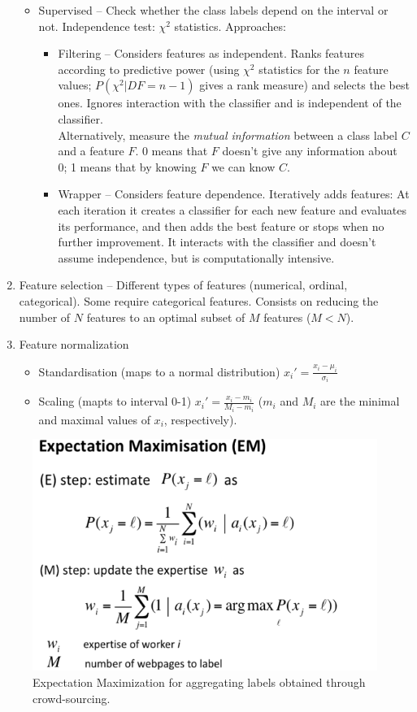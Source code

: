 \begin{enumerate}
\begin{itemize}
			\item Supervised -- Check whether the class labels depend on the interval or not. Independence test: $\chi^2$ statistics. Approaches:
			\begin{itemize}
				\item Filtering -- Considers features as independent. Ranks features according to predictive power (using $\chi^2$ statistics for the $n$ feature values; $P(\chi^2 | DF=n-1)$ gives a rank measure) and selects the best ones. Ignores interaction with the classifier and is independent of the classifier.\\
				Alternatively, measure the \emph{mutual information} between a class label $C$ and a feature $F$. 0 means that $F$ doesn't give any information about 0; 1 means that by knowing $F$ we can know $C$.
				\item Wrapper -- Considers feature dependence. Iteratively adds features: At each iteration it creates a classifier for each new feature and evaluates its performance, and then adds the best feature or stops when no further improvement. It interacts with the classifier and doesn't assume independence, but is computationally intensive.
			\end{itemize}
		\end{itemize}
		\item Feature selection -- Different types of features (numerical, ordinal, categorical). Some require categorical features. Consists on reducing the number of $N$ features to an optimal subset of $M$ features ($M<N$).
		\item Feature normalization
		\begin{itemize}
			\item Standardisation (maps to a normal distribution) $x_i'=\frac{x_i-\mu_i}{\sigma_i}$
			\item Scaling (mapts to interval 0-1) $x_i'=\frac{x_i-m_i}{M_i-m_i}$ ($m_i$ and $M_i$ are the minimal and maximal values of $x_i$, respectively).
		\end{itemize}
	\end{enumerate}

    \begin{figure}[htp]
      \centering
        \includegraphics[width=.6\textwidth]{images/emcr.png}
        \caption{Expectation Maximization for aggregating labels obtained through crowd-sourcing.}
        \label{fig:emcr}
    \end{figure}

